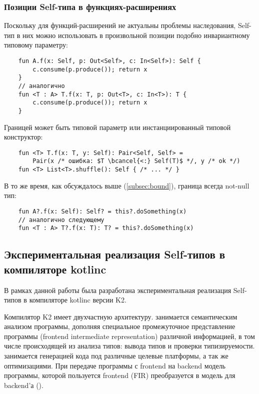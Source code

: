 \subsubsection{Позиции Self-типа в функциях-расширениях} \label{subsubsec:extension-position}

Поскольку для функций-расширений не актуальны проблемы наследования, Self-тип в них можно использовать в произвольной позиции подобно инвариантному типовому параметру:

\begin{verbatim}
    fun A.f(x: Self, p: Out<Self>, c: In<Self>): Self {
        c.consume(p.produce()); return x
    }
    // аналогично
    fun <T : A> T.f(x: T, p: Out<T>, c: In<T>): T {
        c.consume(p.produce()); return x
    }
\end{verbatim}

Границей может быть типовой параметр или инстанциированный типовой конструктор:

\begin{verbatim}
    fun <T> T.f(x: T, y: Self): Pair<Self, Self> =
        Pair(x /* ошибка: $T \bcancel{<:} Self(T)$ */, y /* ok */)
    fun <T> List<T>.shuffle(): Self { /* ... */ }
\end{verbatim}

В то же время, как обсуждалось выше (\ref{subsec:bound}), граница всегда not-null тип:

\begin{verbatim}
    fun A?.f(x: Self): Self? = this?.doSomething(x)
    // аналогично следующему
    fun <T : A> T?.f(x: T): T? = this?.doSomething(x)
\end{verbatim}


\subsection{Экспериментальная реализация Self-типов в компиляторе kotlinc}

В рамках данной работы была разработана экспериментальная реализация Self-типов в компиляторе kotlinc версии K2.

Компилятор K2 имеет двухчастную архитектуру.
 занимается семантическим анализом программы, дополняя специальное промежуточное представление программы  (frontend intermediate representation) различной информацией, в том числе происходящей из анализа типов: вывода типов и проверки типизируемости.
 занимается генерацией кода под различные целевые платформы, а так же оптимизациями.
При передаче программы с frontend на backend модель программы, которой пользуется frontend (FIR) преобразуется в модель для backend'а ().

